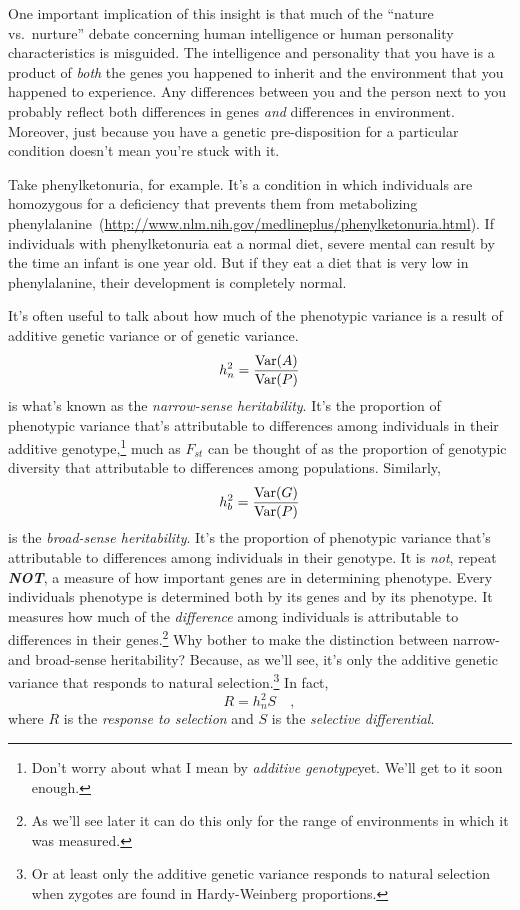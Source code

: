 One important implication of this insight is that much of the ``nature
vs.\ nurture'' debate concerning human intelligence or human
personality characteristics is misguided. The intelligence and
personality that you have is a product of {\it both} the genes you
happened to inherit and the environment that you happened to
experience. Any differences between you and the person next to you
probably reflect both differences in genes {\it and\/} differences in
environment. Moreover, just because you have a genetic pre-disposition
for a particular condition doesn't mean you're stuck with it.

Take phenylketonuria, for example. It's a condition in which
individuals are homozygous for a deficiency that prevents them from
metabolizing
phenylalanine~(\url{http://www.nlm.nih.gov/medlineplus/phenylketonuria.html}). If
individuals with phenylketonuria eat a normal diet, severe mental can
result by the time an infant is one year old. But if they eat a diet
that is very low in phenylalanine, their development is completely
normal.

It's often useful to talk about how much of the phenotypic variance is
a result of additive genetic variance or of genetic variance.
\[
h^2_n = \frac{\mbox{Var}(A)}{\mbox{Var}(P)}
\]
is what's known as the {\it narrow-sense heritability}. It's the
proportion of phenotypic variance that's attributable to differences
among individuals in their additive genotype,\footnote{Don't worry
  about what I mean by {\it additive genotype}{\dash}yet. We'll get to
  it soon enough.} much as $F_{st}$ can be thought of as the
proportion of genotypic diversity that attributable to differences
among populations. Similarly,
\[
h^2_b = \frac{\mbox{Var}(G)}{\mbox{Var}(P)}
\]
is the {\it broad-sense heritability}. It's the proportion of
phenotypic variance that's attributable to differences among
individuals in their genotype. It is {\it not}, repeat {\bf\it NOT}, a
measure of how important genes are in determining phenotype. Every
individuals phenotype is determined both by its genes and by its
phenotype. It measures how much of the {\it difference\/} among
individuals is attributable to differences in their genes.\footnote{As
  we'll see later it can do this only for the range of environments in
  which it was measured.} Why bother
to make the distinction between narrow- and broad-sense heritability?
Because, as we'll see, it's only the additive genetic variance that
responds to natural selection.\footnote{Or at least only the additive
  genetic variance responds to natural selection when zygotes are
  found in Hardy-Weinberg proportions.} In fact,
\[
R = h^2_nS \quad ,
\]
where $R$ is the {\it response to selection\/} and $S$ is the
{\it selective differential}.

